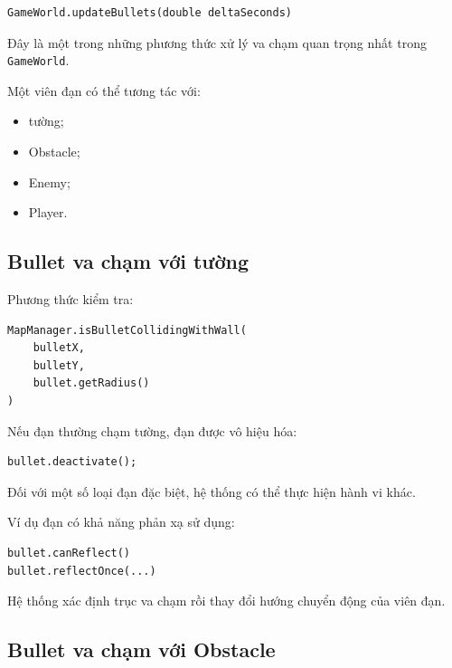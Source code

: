 \documentclass[12pt,a4paper]{report}
\begin{document}
    \begin{verbatim}
GameWorld.updateBullets(double deltaSeconds)
    \end{verbatim}

    Đây là một trong những phương thức xử lý va chạm quan trọng nhất
    trong \texttt{GameWorld}.

    Một viên đạn có thể tương tác với:

    \begin{itemize}
        \item tường;
        \item Obstacle;
        \item Enemy;
        \item Player.
    \end{itemize}



    \subsection{Bullet va chạm với tường}

    Phương thức kiểm tra:

    \begin{verbatim}
MapManager.isBulletCollidingWithWall(
    bulletX,
    bulletY,
    bullet.getRadius()
)
    \end{verbatim}

    Nếu đạn thường chạm tường, đạn được vô hiệu hóa:

    \begin{verbatim}
bullet.deactivate();
    \end{verbatim}

    Đối với một số loại đạn đặc biệt, hệ thống có thể thực hiện
    hành vi khác.

    Ví dụ đạn có khả năng phản xạ sử dụng:

    \begin{verbatim}
bullet.canReflect()
bullet.reflectOnce(...)
    \end{verbatim}

    Hệ thống xác định trục va chạm rồi thay đổi hướng chuyển động
    của viên đạn.



    \subsection{Bullet va chạm với Obstacle}
\end{document}
